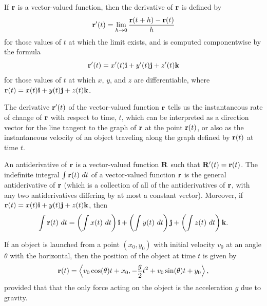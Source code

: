 \begin{summary}
\item If $\mathbf{r}$ is a vector-valued function, then the derivative of
$\mathbf{r}$ is defined by
\[ \mathbf{r}'(t) = \lim_{h \to 0} \frac{\mathbf{r}(t+h)-\mathbf{r}(t)}{h}\] for those
values of $t$ at which the limit exists, and is computed componentwise
by the formula
\[ \mathbf{r}'(t) = x'(t) \mathbf{i} + y'(t) \mathbf{j} + z'(t) \mathbf{k} \] for those values of
$t$ at which $x$, $y$, and $z$ are differentiable, where $\mathbf{r}(t) =
x(t) \mathbf{i} + y(t) \mathbf{j} + z(t) \mathbf{k}$.

\item The derivative $\mathbf{r}'(t)$ of the vector-valued function $\mathbf{r}$
tells us the instantaneous rate of change of $\mathbf{r}$ with respect to
time, $t$, which can be interpreted as a direction vector for the line
tangent to the graph of $\mathbf{r}$ at the point $\mathbf{r}(t)$, or also as the
instantaneous velocity of an object traveling along the graph defined
by $\mathbf{r}(t)$ at time $t$.
 
\item An antiderivative of $\mathbf{r}$ is a vector-valued function $\mathbf{R}$
such that $\mathbf{R}'(t) = \mathbf{r}(t)$.  The indefinite integral $\int \mathbf{r}(t) \
dt$ of a vector-valued function $\mathbf{r}$ is the general antiderivative of
$\mathbf{r}$ (which is a collection of all of the antiderivatives of $\mathbf{r}$,
with any two antiderivatives differing by at most a constant vector).
Moreover, if $\mathbf{r}(t) = x(t) \mathbf{i} + y(t) \mathbf{j} + z(t) \mathbf{k}$, then
\[\int \mathbf{r}(t) \ dt = \left(\int x(t) \ dt\right) \mathbf{i} + \left( \int
y(t) \ dt \right) \mathbf{j} + \left(\int z(t) \ dt\right) \mathbf{k}.\]

\item If an object is launched from a point $(x_0,y_0)$ with initial
velocity $v_0$ at an angle $\theta$ with the horizontal, then the
position of the object at time $t$ is given by
\[\mathbf{r}(t) = \left\langle v_0 \cos(\theta)t + x_0, -\frac{g}{2}t^2 + v_0
\sin(\theta)t + y_0 \right\rangle,\] provided that that the only force
acting on the object is the acceleration $g$ due to gravity.
\end{summary}


\nin \hrulefill

\newpage



